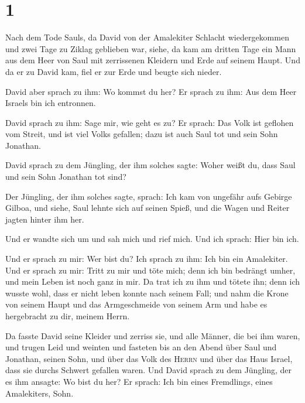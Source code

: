 \hypertarget{section}{%
\section{1}\label{section}}

 Nach dem Tode Sauls, da David von der Amalekiter Schlacht
wiedergekommen und zwei Tage zu Ziklag geblieben war, 
siehe, da kam am dritten Tage ein Mann aus dem Heer von Saul mit
zerrissenen Kleidern und Erde auf seinem Haupt. Und da er zu David kam,
fiel er zur Erde und beugte sich nieder.

 David aber sprach zu ihm: Wo kommst du her? Er sprach zu
ihm: Aus dem Heer Israels bin ich entronnen.

 David sprach zu ihm: Sage mir, wie geht es zu? Er sprach:
Das Volk ist geflohen vom Streit, und ist viel Volks gefallen; dazu ist
auch Saul tot und sein Sohn Jonathan.

 David sprach zu dem Jüngling, der ihm solches sagte:
Woher weißt du, dass Saul und sein Sohn Jonathan tot sind?

 Der Jüngling, der ihm solches sagte, sprach: Ich kam von
ungefähr aufs Gebirge Gilboa, und siehe, Saul lehnte sich auf seinen
Spieß, und die Wagen und Reiter jagten hinter ihm her.

 Und er wandte sich um und sah mich und rief mich. Und ich
sprach: Hier bin ich.

 Und er sprach zu mir: Wer bist du? Ich sprach zu ihm: Ich
bin ein Amalekiter.  Und er sprach zu mir: Tritt zu mir
und töte mich; denn ich bin bedrängt umher, und mein Leben ist noch ganz
in mir.  Da trat ich zu ihm und tötete ihn; denn ich
wusste wohl, dass er nicht leben konnte nach seinem Fall; und nahm die
Krone von seinem Haupt und das Armgeschmeide von seinem Arm und habe es
hergebracht zu dir, meinem Herrn.

 Da fasste David seine Kleider und zerriss sie, und alle
Männer, die bei ihm waren,  und trugen Leid und weinten
und fasteten bis an den Abend über Saul und Jonathan, seinen Sohn, und
über das Volk des \textsc{Herrn} und über das Haus Israel, dass sie
durchs Schwert gefallen waren.  Und David sprach zu dem
Jüngling, der es ihm ansagte: Wo bist du her? Er sprach: Ich bin eines
Fremdlings, eines Amalekiters, Sohn.

